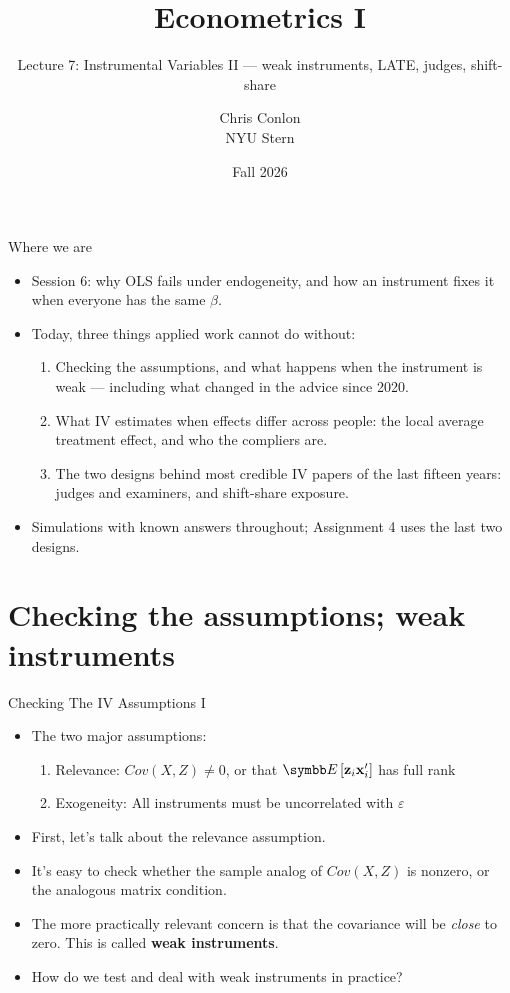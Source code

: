 \documentclass[aspectratio=169,11pt]{beamer}
\title[L8b - Instrumental Variables II]{ Econometrics I}
\subtitle{Lecture 7: Instrumental Variables II --- weak instruments, LATE, judges, shift-share}
\author{Chris Conlon \\NYU Stern}
\date{Fall 2026}
\begin{document}
\maketitle


\begin{frame}{Where we are}
\begin{itemize}
	\item Session 6: why OLS fails under endogeneity, and how an instrument fixes it when everyone has the
	same $\beta$.
	\medskip
	\item Today, three things applied work cannot do without:
	\begin{enumerate}
		\item \alert{Checking the assumptions}, and what happens when the instrument is \alert{weak} --- including
		what changed in the advice since 2020.
		\item What IV estimates when effects \alert{differ across people}: the local average treatment effect,
		and who the compliers are.
		\item The two designs behind most credible IV papers of the last fifteen years: \alert{judges and examiners},
		and \alert{shift-share} exposure.
	\end{enumerate}
	\medskip
	\item Simulations with known answers throughout; Assignment 4 uses the last two designs.
\end{itemize}
\end{frame}

\section{Checking the assumptions; weak instruments}

\begin{frame}{Checking The IV Assumptions I}
\begin{itemize}
\item The two major assumptions:
\begin{enumerate}
	\item Relevance: $Cov(X,Z)\ne 0$, or that $\E\left[{\bf z}_i {\bf x}_i' \right]$ has full rank

	\item Exogeneity: All instruments must be uncorrelated with $\varepsilon$
\end{enumerate}
\smallskip
\item First, let's talk about the relevance assumption.
	\item It's easy to check whether the sample analog of $Cov(X,Z)$ is nonzero, or the analogous
	matrix condition.
	 \item The more practically relevant concern is that the covariance will be \emph{close}
	 to zero. This is called {\bf weak instruments}.
	 \item How do we test and deal with weak instruments in practice?

\end{itemize}
\end{frame}
\end{document}
